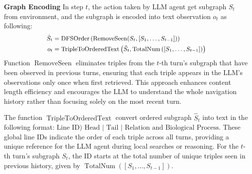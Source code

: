 \textbf{Graph Encoding} In step $t$, the action taken by LLM agent get subgraph $S_t$ from environment, and the subgraph is encoded into text observation $o_t$ as following:
\begin{equation}
\small
\begin{aligned}
\hat{S}_t&=\operatorname{DFSOrder}\left(\operatorname{RemoveSeen}(S_t,[S_1, \dots, S_{t-1}])\right) \\
o_t&=\operatorname{TripleToOrderedText}\left(\hat{S}_t, \operatorname{TotalNum}\left([S_1, \dots, S_{t-1}]\right)\right)
\end{aligned}
\end{equation}
Function $\operatorname{RemoveSeen}$ eliminates triples from the $t$-th turn's subgraph that have been observed in previous turns, ensuring that each triple appears in the LLM's observations only once when first retrieved. This approach enhances content length efficiency and encourages the LLM to understand the whole navigation history rather than focusing solely on the most recent turn.

The function $\operatorname{TripleToOrderedText}$ convert ordered subgraph $\hat{S}_t$ into text in the following format: 
$ \text{Line ID)}  \text{ Head } |  \text{ Tail } | \text{ Relation and Biological Process}$. 
These global line IDs indicate the order of each triple across all turns, providing a unique reference for the LLM agent during local searches or reasoning. For the $t$-th turn's subgraph $S_t$, the ID starts at the total number of unique triples seen in previous history, given by $\operatorname{TotalNum}([S_1, \dots, S_{t-1}])$. 











